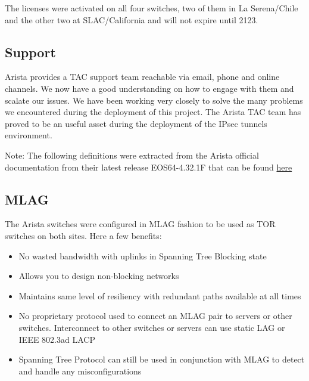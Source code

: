 The licenses were activated on all four switches, two of them in La Serena/Chile and the other two at SLAC/California and will not expire until 2123.

\subsection{Support}

Arista provides a TAC support team reachable via email, phone and online channels. We now have a good understanding on how to engage with them and scalate our issues. We have been working very closely to solve the many problems we encountered during the deployment of this project.
The Arista TAC team has proved to be an useful asset during the deployment of the IPsec tunnels environment.  

Note: The following definitions were extracted from the Arista official documentation from their latest release EOS64-4.32.1F that can be found \href{https://www.arista.com/en/um-eos/eos-data-plane-security#xx1009511}{here}

\newpage

\subsection{MLAG}
The Arista switches were configured in MLAG fashion to be used as TOR switches on both sites. Here a few benefits:

\begin{itemize}
    \item No wasted bandwidth with uplinks in Spanning Tree Blocking state
    \item Allows you to design non-blocking networks
    \item Maintains same level of resiliency with redundant paths available at all times
    \item No proprietary protocol used to connect an MLAG pair to servers or other switches. Interconnect to other switches or servers can use static LAG or IEEE 802.3ad LACP
    \item Spanning Tree Protocol can still be used in conjunction with MLAG to detect and handle any misconfigurations
\end{itemize}

\newpage

